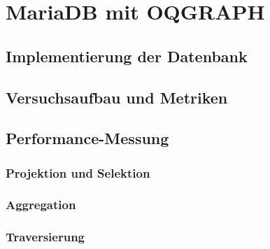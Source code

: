 \setcounter{chapter}{4}

\section{MariaDB mit OQGRAPH}%
\subsection{Implementierung der Datenbank}
\subsection{Versuchsaufbau und Metriken}
\subsection{Performance-Messung}
\subsubsection{Projektion und Selektion}
\subsubsection{Aggregation}
\subsubsection{Traversierung}